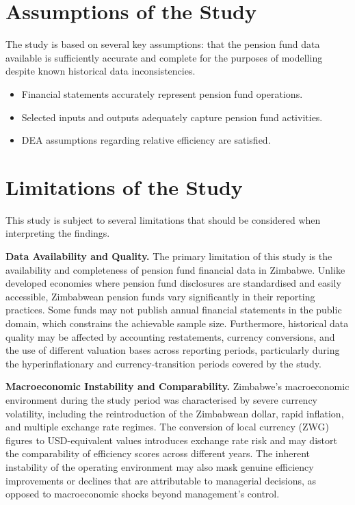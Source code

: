 \documentclass[12pt,a4paper]{article}
\begin{document}
\section{Assumptions of the Study} 

The study is based on several key assumptions: that the pension fund data available is sufficiently accurate and complete for the purposes of modelling despite known historical data inconsistencies.

\begin{itemize}[noitemsep]
    \item Financial statements accurately represent pension fund operations.
    \item Selected inputs and outputs adequately capture pension fund activities.
    \item DEA assumptions regarding relative efficiency are satisfied.
\end{itemize}

\section{Limitations of the Study}

This study is subject to several limitations that should be considered when interpreting the findings.

\textbf{Data Availability and Quality.} The primary limitation of this study is the availability and completeness of pension fund financial data in Zimbabwe. Unlike developed economies where pension fund disclosures are standardised and easily accessible, Zimbabwean pension funds vary significantly in their reporting practices. Some funds may not publish annual financial statements in the public domain, which constrains the achievable sample size. Furthermore, historical data quality may be affected by accounting restatements, currency conversions, and the use of different valuation bases across reporting periods, particularly during the hyperinflationary and currency-transition periods covered by the study.

\textbf{Macroeconomic Instability and Comparability.} Zimbabwe's macroeconomic environment during the study period was characterised by severe currency volatility, including the reintroduction of the Zimbabwean dollar, rapid inflation, and multiple exchange rate regimes. The conversion of local currency (ZWG) figures to USD-equivalent values introduces exchange rate risk and may distort the comparability of efficiency scores across different years. The inherent instability of the operating environment may also mask genuine efficiency improvements or declines that are attributable to managerial decisions, as opposed to macroeconomic shocks beyond management's control.
\end{document}
